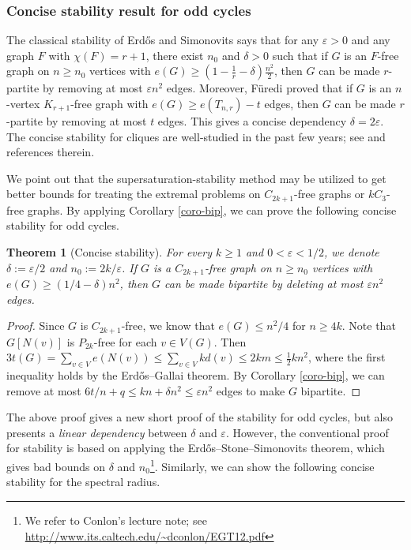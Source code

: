 \documentclass[11pt]{article}
\newtheorem{theorem}{Theorem}[section]
\begin{document}
\subsubsection{Concise stability result for odd cycles}

The classical stability of Erd\H{o}s and Simonovits says that 
for any $\varepsilon >0$ and any graph $F$ with $\chi (F)=r+1$, there exist $n_0$ and $\delta >0$ such that 
if $G$ is an $F$-free graph on $n\ge n_0$ vertices with 
$e(G)\ge (1- \frac{1}{r} - \delta )\frac{n^2}{2}$, then $G$ can be made $r$-partite by removing at most $\varepsilon n^2$ edges. Moreover,  F\"{u}redi \cite{Fur2015} proved that 
if $G$ is an $n$-vertex $K_{r+1}$-free graph with 
$e(G)\ge e(T_{n,r}) - t$ edges, then $G$ can be made $r$-partite by removing at most $t$ edges. 
This gives a concise dependency $\delta =2\varepsilon$. 
 The concise stability for cliques are well-studied in the past few years;  see \cite{RS2018,Liu2021,BCLLP2021,KRS2021} and references therein. 

We point out that 
the supersaturation-stability method may be utilized to get better bounds 
for treating the extremal problems 
on $C_{2k+1}$-free graphs or $kC_3$-free graphs. 
By applying Corollary \ref{coro-bip}, 
we can prove the following concise stability for odd cycles. 


\begin{theorem}[Concise stability]
For every $k\ge 1$ and $0<\varepsilon < 1/2$, 
we denote $\delta := \varepsilon /2$ and 
$n_0:= 2k / \varepsilon$. 
If $G$ is a $C_{2k+1}$-free graph on $n\ge n_0$ vertices 
with $e(G)\ge ({1}/{4} - \delta )n^2$, 
then $G$ can be made bipartite by deleting at most $\varepsilon n^2$ edges. 
\end{theorem}

\begin{proof}
Since $G$ is $C_{2k+1}$-free, we know that $e(G)\le n^2/4$ 
for $n\ge 4k$. Note that 
$G[N(v)]$ is $P_{2k}$-free for each $v\in V(G)$.
Then $3t(G) = \sum_{v\in V} e(N(v))  \le \sum_{v\in V} kd(v) \le 2km \le \frac{1}{2}kn^2$, 
where the first inequality holds by the Erd\H{o}s--Gallai theorem. 
By Corollary \ref{coro-bip}, we can remove 
at most $6t/n +q \le kn + \delta n^2\le \varepsilon n^2$ 
edges to make $G$ bipartite. 
\end{proof}



The above proof gives a new short proof of the stability for odd cycles, but also presents  a {\it linear dependency} between $\delta$ and $\varepsilon$.  
However, the conventional proof for stability 
is based on applying the Erd\H{o}s--Stone--Simonovits theorem, which gives 
bad bounds on $\delta$ and $n_0$\footnote{We refer to Conlon's lecture note; see \url{http://www.its.caltech.edu/~dconlon/EGT12.pdf}}. 
Similarly, we can show the following concise stability for the 
spectral radius. 
\end{document}

